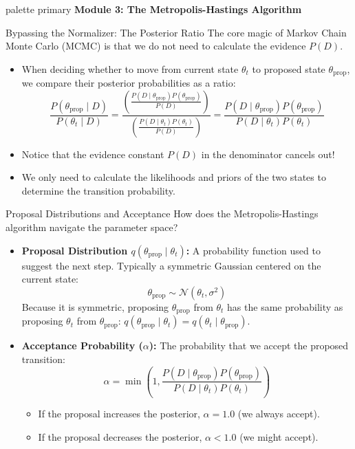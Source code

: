\documentclass[9pt]{beamer}
\begin{document}
\begin{frame}[plain]
  \vfill
  \centering
  \begin{beamercolorbox}[sep=8pt,center,shadow=true,rounded=true]{palette primary}
    \textbf{Module 3: The Metropolis-Hastings Algorithm}
  \end{beamercolorbox}
  \vfill
\end{frame}

\begin{frame}{Bypassing the Normalizer: The Posterior Ratio}
  The core magic of Markov Chain Monte Carlo (MCMC) is that we do not need to calculate the evidence $P(D)$.
  \begin{itemize}
    \item When deciding whether to move from current state $\theta_t$ to proposed state $\theta_{\text{prop}}$, we compare their posterior probabilities as a ratio:
      $$\frac{P(\theta_{\text{prop}} \mid D)}{P(\theta_t \mid D)} = \frac{\left( \frac{P(D \mid \theta_{\text{prop}}) P(\theta_{\text{prop}})}{P(D)} \right)}{\left( \frac{P(D \mid \theta_t) P(\theta_t)}{P(D)} \right)} = \frac{P(D \mid \theta_{\text{prop}}) P(\theta_{\text{prop}})}{P(D \mid \theta_t) P(\theta_t)}$$
    \item Notice that the evidence constant $P(D)$ in the denominator cancels out!
    \item We only need to calculate the likelihoods and priors of the two states to determine the transition probability.
  \end{itemize}
\end{frame}

\begin{frame}{Proposal Distributions and Acceptance}
  How does the Metropolis-Hastings algorithm navigate the parameter space?
  \begin{itemize}
    \item \textbf{Proposal Distribution $q(\theta_{\text{prop}} \mid \theta_t)$:}
      A probability function used to suggest the next step. Typically a symmetric Gaussian centered on the current state:
      $$\theta_{\text{prop}} \sim \mathcal{N}(\theta_t, \sigma^2)$$
      Because it is symmetric, proposing $\theta_{\text{prop}}$ from $\theta_t$ has the same probability as proposing $\theta_t$ from $\theta_{\text{prop}}$: $q(\theta_{\text{prop}} \mid \theta_t) = q(\theta_t \mid \theta_{\text{prop}})$.
    \item \textbf{Acceptance Probability ($\alpha$):}
      The probability that we accept the proposed transition:
      $$\alpha = \min\left(1, \frac{P(D \mid \theta_{\text{prop}}) P(\theta_{\text{prop}})}{P(D \mid \theta_t) P(\theta_t)}\right)$$
      \begin{itemize}
        \item If the proposal increases the posterior, $\alpha = 1.0$ (we always accept).
        \item If the proposal decreases the posterior, $\alpha < 1.0$ (we might accept).
      \end{itemize}
  \end{itemize}
\end{frame}
\end{document}
